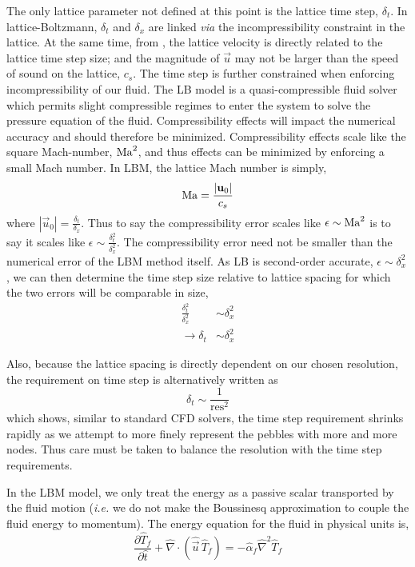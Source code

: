 The only lattice parameter not defined at this point is the lattice time step, $\delta_t$. In lattice-Boltzmann, $\delta_t$ and $\delta_x$ are linked \textit{via} the incompressibility constraint in the lattice. At the same time, from , the lattice velocity is directly related to the lattice time step size; and the magnitude of $\vec{u}$ may not be larger than the speed of sound on the lattice, $c_s$. The time step is further constrained when enforcing incompressibility of our fluid. The LB model is a quasi-compressible fluid solver which permits slight compressible regimes to enter the system to solve the pressure equation of the fluid. Compressibility effects will impact the numerical accuracy and should therefore be minimized. Compressibility effects scale like the square Mach-number, $\mathrm{Ma}^2$, and thus effects can be minimized by enforcing a small Mach number. In LBM, the lattice Mach number is simply,
\begin{equation}
 	\mathrm{Ma} = \frac{|\mathbf{u}_0|}{c_s}
\end{equation}
where $|\vec{u}_0| = \frac{\delta_t}{\delta_x}$. Thus to say the compressibility error scales like $\epsilon \sim \mathrm{Ma}^2$ is to say it scales like $\epsilon \sim \frac{\delta_t^2}{\delta_x^2}$. The compressibility error need not be smaller than the numerical error of the LBM method itself. As LB is second-order accurate\cite{succi2001lattice}, $\epsilon \sim \delta_x^2$, we can then determine the time step size relative to lattice spacing for which the two errors will be comparable in size,
\begin{align*}
	\frac{\delta_t^2}{\delta_x^2} &\sim \delta_x^2\\
	\rightarrow \delta_t &\sim \delta_x^2
\end{align*}

Also, because the lattice spacing is directly dependent on our chosen resolution, the requirement on time step is alternatively written as
\begin{equation}
	\delta_t \sim \frac{1}{\text{res}^2}
\end{equation}
which shows, similar to standard CFD solvers, the time step requirement shrinks rapidly as we attempt to more finely represent the pebbles with more and more nodes. Thus care must be taken to balance the resolution with the time step requirements.

In the LBM model, we only treat the energy as a passive scalar transported by the fluid motion (\textit{i.e.} we do not make the Boussinesq approximation to couple the fluid energy to momentum). The energy equation for the fluid in physical units is,
\begin{equation}
	\frac{\partial \hat{T}_f}{\partial \hat{t}} + \hat{\nabla}\cdot(\hat{\vec{u}}\,\hat{T}_f) = -\hat{\alpha}_f\hat{\nabla}^2\hat{T}_f
\end{equation}

